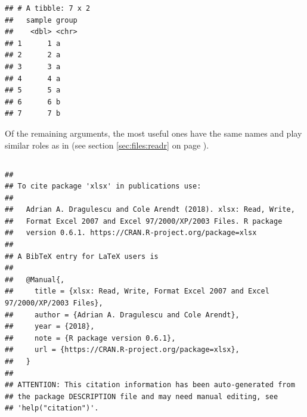 \documentclass[krantz2]{krantz}\usepackage{knitr}%
\begin{document}
\begin{knitrout}\footnotesize
{}\color{fgcolor}\begin{kframe}
\begin{alltt}
 \hlkwb{<-} \hlstd{(}\hlstd{,}  \hlstd{=} \hlstd{,}  \hlstd{=} \hlstd{)}
\end{alltt}
\begin{verbatim}
## # A tibble: 7 x 2
##   sample group
##    <dbl> <chr>
## 1      1 a    
## 2      2 a    
## 3      3 a    
## 4      4 a    
## 5      5 a    
## 6      6 b    
## 7      7 b
\end{verbatim}
\end{kframe}
\end{knitrout}

Of the remaining arguments, the most useful ones have the same names and play similar roles as in  (see section \ref{sec:files:readr} on page \pageref{sec:files:readr}).

\subsection['xlsx']{}

\begin{knitrout}\footnotesize
{}\color{fgcolor}\begin{kframe}
\begin{alltt}
\hlstd{(} \hlstd{=} \hlstd{)}
\end{alltt}
\begin{verbatim}
## 
## To cite package 'xlsx' in publications use:
## 
##   Adrian A. Dragulescu and Cole Arendt (2018). xlsx: Read, Write,
##   Format Excel 2007 and Excel 97/2000/XP/2003 Files. R package
##   version 0.6.1. https://CRAN.R-project.org/package=xlsx
## 
## A BibTeX entry for LaTeX users is
## 
##   @Manual{,
##     title = {xlsx: Read, Write, Format Excel 2007 and Excel 97/2000/XP/2003 Files},
##     author = {Adrian A. Dragulescu and Cole Arendt},
##     year = {2018},
##     note = {R package version 0.6.1},
##     url = {https://CRAN.R-project.org/package=xlsx},
##   }
## 
## ATTENTION: This citation information has been auto-generated from
## the package DESCRIPTION file and may need manual editing, see
## 'help("citation")'.
\end{verbatim}
\end{kframe}
\end{knitrout}
\end{document}
